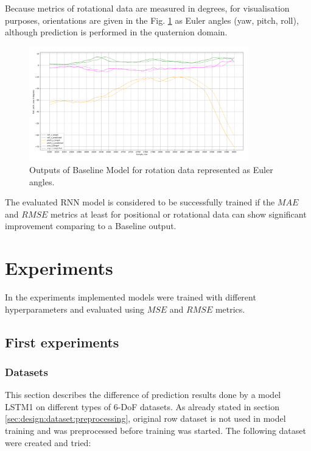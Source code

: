 Because metrics of rotational data are measured in degrees, for visualisation purposes, orientations are given in the Fig. \ref{fig:base_euler} as Euler angles (yaw, pitch, roll), although prediction is performed in the quaternion domain.

\begin{figure}[htb]
	\begin{center}
		\includegraphics[width=0.85\textwidth, keepaspectratio]{gfx/base_euler-roll_pitch_yaw.png}
		\caption{\label{fig:base_euler} Outputs of Baseline Model for rotation data represented as Euler angles.}
	\end{center}
\end{figure}

The evaluated RNN model is considered to be successfully trained if the $MAE$ and $RMSE$ metrics at least for positional or rotational data can show significant improvement comparing to a Baseline output. 

\newpage
\section{Experiments}
\label{sec:eval:experiments}
In the experiments implemented models were trained with different hyperparameters and evaluated using $MSE$ and $RMSE$ metrics. 

\subsection{First experiments}
\label{sec:eval:experiments:early}

\subsubsection{Datasets}
\label{sec:eval:experiments:early:ds}
This section describes the difference of prediction results done by a model LSTM1 on different types of 6-DoF datasets. As already stated in section \ref{sec:design:dataset:preprocessing}, original row dataset is not used in model training and was preprocessed before training was started. The following dataset were created and tried:

